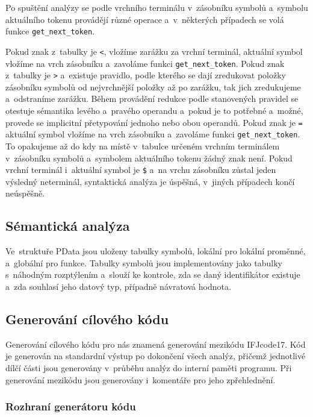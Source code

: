 \documentclass[a4paper, 11pt]{article}
\begin{document}
	Po spuštění analýzy se podle vrchního terminálu v~zásobníku symbolů a~symbolu aktuálního tokenu provádějí různé
	operace a~v~některých případech se volá funkce \texttt{get\_next\_token}.

	Pokud znak z~tabulky je \texttt{<}, vložíme zarážku za vrchní terminál, aktuální symbol vložíme na vrch zásobníku
	a~zavoláme funkci \texttt{get\_next\_token}. Pokud znak z~tabulky je \texttt{>} a~existuje pravidlo, podle kterého
	se dají zredukovat položky zásobníku symbolů od nejvrchnější položky až po zarážku, tak jich zredukujeme a~odstraníme
	zarážku. Během provádění redukce podle stanovených pravidel se otestuje sémantika levého a~pravého operandu a~pokud
	je to potřebné a~možné, provede se implicitní přetypování jednoho nebo obou operandů. Pokud znak je \texttt{=} aktuální
	symbol vložíme na vrch zásobníku a~zavoláme funkci \texttt{get\_next\_token}. To opakujeme až do kdy na místě v~tabulce
	určeném vrchním terminálem v~zásobníku symbolů a~symbolem aktuálního tokenu žádný znak není. Pokud vrchní terminál
	i~aktuální symbol je \texttt{\$} a~na vrchu zásobníku zůstal jeden výsledný neterminál, syntaktická analýza je
	úspěšná, v~jiných případech končí neúspěšně.

	\subsection{Sémantická analýza}

	Ve~struktuře PData jsou uloženy tabulky symbolů, lokální pro lokální proměnné, a~globální pro funkce. Tabulky symbolů jsou implementovány jako tabulky s~náhodným rozptýlením a~slouží ke kontrole, zda se daný identifikátor existuje a~zda souhlasí jeho datový typ, případně návratová hodnota.

	\subsection{Generování cílového kódu}

	Generování cílového kódu pro nás znamená generování mezikódu IFJcode17. Kód je generován na standardní výstup
	po dokončení všech analýz, přičemž jednotlivé dílčí části jsou generovány v~průběhu analýz do interní paměti
	programu. Při generování mezikódu jsou generovány i~komentáře pro jeho zpřehlednění.

	\subsubsection{Rozhraní generátoru kódu}
\end{document}
